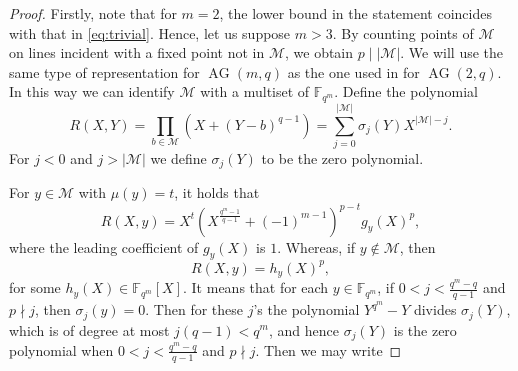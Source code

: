 \documentclass[12pt]{article}
\newcommand{\cM}{{\mathcal M}}
\newcommand{\cS}{{\mathcal S}}
\newcommand{\F}{{\mathbb F}}
\renewcommand{\mod}{\hbox{{\rm mod}\,}}
\DeclareMathOperator{\AG}{{AG}}
\begin{document}
\begin{proof}
	Firstly, note that for $m=2$, the lower bound in the statement coincides with that in \eqref{eq:trivial}. Hence, let us suppose $m >3$. 
	By counting points of $\cM$ on lines incident with a fixed point not in $\cM$, we obtain $p \mid |\cM|$. 
	We will use the same type of representation for $\AG(m,q)$ as the one used in \cite[Section 2]{5nomi} for $\AG(2,q)$. 
	In this way we can identify $\cM$ with a multiset of $\F_{q^m}$. Define the polynomial
	\[
	R(X,Y)=\prod_{b\in \cM}(X+(Y-b)^{q-1})=\sum_{j=0}^{|\cM|}\sigma_j(Y)X^{|\cM|-j}.
	\] 
	For $j<0$ and $j>|\cM|$ we define $\sigma_{j}(Y)$ to be the zero polynomial.
	
	For $y\in \cM$ with $\mu(y)=t$, it holds that
	\begin{equation}
		\label{eq0}
		R(X,y)=X^t\left (X^{\frac{q^{m}-1}{q-1}}+(-1)^{m-1} 
		\right )^{p-t}g_y(X)^p,
	\end{equation}
	where the leading coefficient of $g_y(X)$ is $1$. 
	Whereas, if $y\notin \cM$, then
	\begin{equation}
		\label{eq00}
		R(X,y)=h_y(X)^p,
	\end{equation}
	for some $h_y(X)\in \F_{q^m}[X]$. 
	It means that for each $y\in \F_{q^m}$, if $0<j< \frac{q^{m}-q}{q-1}$ and $p \nmid j$, then $\sigma_j(y)=0$. Then for these $j$'s the polynomial $Y^{q^m}-Y$ divides $\sigma_j(Y)$, which is of degree at most $j(q-1)<q^m$, and hence $\sigma_j(Y)$ is the zero polynomial when $0<j< \frac{q^{m}-q}{q-1}$ and $p \nmid j$. Then we may write
	

\end{proof}
\end{document}
